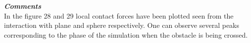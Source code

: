 \noindent \textbf{\textit{\Large{Comments}}}\\[1mm]
\noindent In the figure 28 and 29 local contact forces have been plotted seen from the interaction with plane and sphere respectively. One can observe several peaks corresponding to the
phase of the simulation when the obstacle is being crossed.\\
